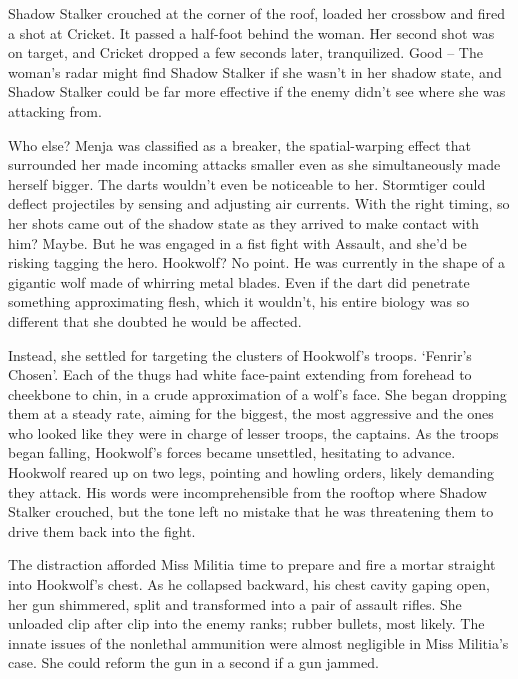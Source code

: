 Shadow Stalker crouched at the corner of the roof, loaded her crossbow and fired a shot at Cricket.  It passed a half-foot behind the woman.  Her second shot was on target, and Cricket dropped a few seconds later, tranquilized.  Good – The woman's radar might find Shadow Stalker if she wasn't in her shadow state, and Shadow Stalker could be far more effective if the enemy didn't see where she was attacking from.



Who else?  Menja was classified as a breaker, the spatial-warping effect that surrounded her made incoming attacks smaller even as she simultaneously made herself bigger.  The darts wouldn't even be noticeable to her.  Stormtiger could deflect projectiles by sensing and adjusting air currents.  With the right timing, so her shots came out of the shadow state as they arrived to make contact with him?  Maybe.  But he was engaged in a fist fight with Assault, and she'd be risking tagging the hero.  Hookwolf?  No point.  He was currently in the shape of a gigantic wolf made of whirring metal blades.  Even if the dart did penetrate something approximating flesh, which it wouldn't, his entire biology was so different that she doubted he would be affected.



Instead, she settled for targeting the clusters of Hookwolf's troops.  `Fenrir's Chosen'.  Each of the thugs had white face-paint extending from forehead to cheekbone to chin, in a crude approximation of a wolf's face.  She began dropping them at a steady rate, aiming for the biggest, the most aggressive and the ones who looked like they were in charge of lesser troops, the captains.  As the troops began falling, Hookwolf's forces became unsettled, hesitating to advance.  Hookwolf reared up on two legs, pointing and howling orders, likely demanding they attack.  His words were incomprehensible from the rooftop where Shadow Stalker crouched, but the tone left no mistake that he was threatening them to drive them back into the fight.



The distraction afforded Miss Militia time to prepare and fire a mortar straight into Hookwolf's chest.  As he collapsed backward, his chest cavity gaping open, her gun shimmered, split and transformed into a pair of assault rifles.  She unloaded clip after clip into the enemy ranks; rubber bullets, most likely.  The innate issues of the nonlethal ammunition were almost negligible in Miss Militia's case.  She could reform the gun in a second if a gun jammed.



